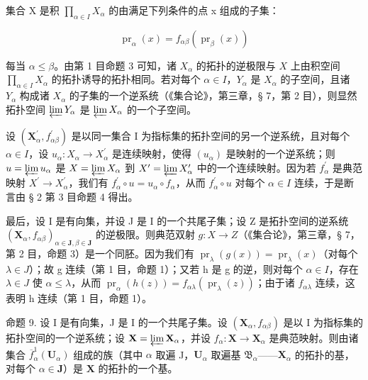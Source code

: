 集合 X 是积 \(\prod_{\alpha\in I}X_{\alpha}\) 的由满足下列条件的点 x 组成的子集：

\[
\operatorname{pr} _ {\alpha} (x) = f _ {\alpha \beta} (\operatorname{pr} _ {\beta} (x))\tag{I}
\]

每当 \(\alpha \leqslant \beta\)。由第 1 目命题 3 可知，诸 \(X_{\alpha}\) 的拓扑的逆极限与 \(X\) 上由积空间 \(\prod_{\alpha \in I} X_{\alpha}\) 的拓扑诱导的拓扑相同。若对每个 \(\alpha \in I\)，\(Y_{\alpha}\) 是 \(X_{\alpha}\) 的子空间，且诸 \(Y_{\alpha}\) 构成诸 \(X_{\alpha}\) 的子集的一个逆系统（《集合论》，第三章，§ 7，第 2 目），则显然拓扑空间 \(\varprojlim Y_{\alpha}\) 是 \(\varprojlim X_{\alpha}\) 的一个子空间。

设 \((\mathbf{X}_{\alpha}^{\prime}, f_{\alpha\beta}^{\prime})\) 是以同一集合 I 为指标集的拓扑空间的另一个逆系统，且对每个 \(\alpha \in I\)，设 \(u_{\alpha}: X_{\alpha} \to X_{\alpha}^{\prime}\) 是连续映射，使得 \((u_{\alpha})\) 是映射的一个逆系统；则 \(u = \varprojlim u_{\alpha}\) 是 \(X = \varprojlim X_{\alpha}\) 到 \(X^{\prime} = \varprojlim X_{\alpha}^{\prime}\) 中的一个连续映射。因为若 \(f_{\alpha}^{\prime}\) 是典范映射 \(X^{\prime} \to X_{\alpha}^{\prime}\)，我们有 \(f_{\alpha}^{\prime} \circ u = u_{\alpha} \circ f_{\alpha}\)，从而 \(f_{\alpha}^{\prime} \circ u\) 对每个 \(\alpha \in I\) 连续，于是断言由 § 2 第 3 目命题 4 得出。

最后，设 I 是有向集，并设 J 是 I 的一个共尾子集；设 Z 是拓扑空间的逆系统 \((\mathbf{X}_{\alpha}, f_{\alpha\beta})_{\alpha\in\mathbf{J}, \beta\in\mathbf{J}}\) 的逆极限。则典范双射 \(g: X \to Z\)（《集合论》，第三章，§ 7，第 2 目，命题 3）是一个同胚。因为我们有 \(\operatorname{pr}_{\lambda}(g(x)) = \operatorname{pr}_{\lambda}(x)\)（对每个 \(\lambda \in J\)）；故 g 连续（第 1 目，命题 1）；又若 h 是 g 的逆，则对每个 \(\alpha \in I\)，存在 \(\lambda \in J\) 使 \(\alpha \leqslant \lambda\)，从而 \(\operatorname{pr}_{\alpha}(h(z)) = f_{\alpha\lambda}(\operatorname{pr}_{\lambda}(z))\)；由于诸 \(f_{\alpha\lambda}\) 连续，这表明 h 连续（第 1 目，命题 1）。

命题 9. 设 I 是有向集，J 是 I 的一个共尾子集。设 \((\mathbf{X}_{\alpha}, f_{\alpha \beta})\) 是以 I 为指标集的拓扑空间的一个逆系统；设 \(\mathbf{X} = \varprojlim \mathbf{X}_{\alpha}\)，并设 \(f_{\alpha}: \mathbf{X} \to \mathbf{X}_{\alpha}\) 是典范映射。则由诸集合 \(\overline{f}_{\alpha}^{1}(\mathbf{U}_{\alpha})\) 组成的族（其中 \(\alpha\) 取遍 J，\(\mathbf{U}_{\alpha}\) 取遍基 \(\mathfrak{B}_{\alpha}\)——\(\mathbf{X}_{\alpha}\) 的拓扑的基，对每个 \(\alpha \in \mathbf{J}\)）是 \(\mathbf{X}\) 的拓扑的一个基。

